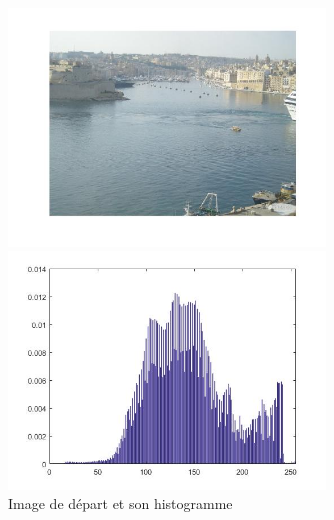 \documentclass{report}
\begin{document}
\begin{figure}
\centering
\begin{minipage}[width=0.5\textwidth]
\centering
\includegraphics[width=0.75\textwidth]{images/im_x.jpg}
\end{minipage}%
\begin{minipage}[width=0.5\textwidth]
\centering
\includegraphics[width=0.75\textwidth]{images/hist_x.jpg}
\end{minipage}
\caption{Image de départ et son histogramme}
\label{fig:im_x}
\end{figure}
\end{document}
